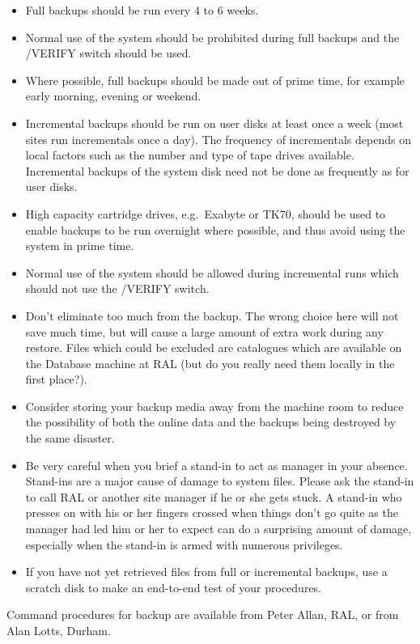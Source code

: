 \begin{itemize}
\item Full backups should be run every 4 to 6 weeks.
\item Normal use of the system should be prohibited during full backups
and the /VERIFY switch should be used.
\item Where possible, full backups should be made out of prime time, for
example early morning, evening or weekend.
\item Incremental backups should be run on user disks at least once a week
(most sites run incrementals once a day).
The frequency of incrementals depends on local factors such as the number and
type of tape drives available.
Incremental backups of the system disk need not be done as frequently as for
user disks.
\item High capacity cartridge drives, e.g.\ Exabyte or TK70, should be used to
enable backups to be run overnight where possible, and thus avoid using the
system in prime time.
\item Normal use of the system should be allowed during incremental runs
which should not use the /VERIFY switch.
\item Don't eliminate too much from the backup.
The wrong choice here will not save much time, but will cause a large amount of
extra work during any restore.
Files which could be excluded are catalogues which are available on the
Database machine at RAL (but do you really need them locally in the first
place?).
\item Consider storing your backup media away from the machine room to reduce
the possibility of both the online data and the backups being destroyed by the
same disaster.
\item Be very careful when you brief a stand-in to act as manager in your
absence.
Stand-ins are a major cause of damage to system files.
Please ask the stand-in to call RAL or another site manager if he or she gets
stuck.
A stand-in who presses on with his or her fingers crossed when things don't
go quite as the manager had led him or her to expect can do a surprising
amount of damage, especially when the stand-in is armed with numerous
privileges.
\item If you have not yet retrieved files from full or incremental backups,
use a scratch disk to make an end-to-end test of your procedures.
\end{itemize}
Command procedures for backup are available from Peter Allan, RAL, or from
Alan Lotts, Durham.

